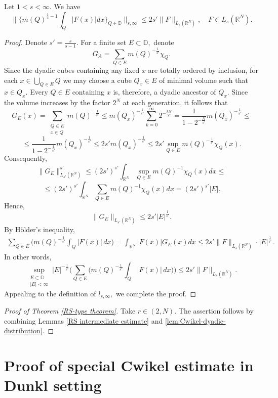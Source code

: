 \documentclass{amsart}
\begin{document}
\begin{lemma}\label{lem:Cwikel-dyadic-distribution} Let $1<s<\infty.$ We have
$$\Big\|\Big\{m(Q)^{\frac1s-1}\int_Q |F(x)|dx\Big\}_{Q\in\mathbb{D} }\Big\|_{s,\infty}\leq 2s'\|F\|_{L_s(\mathbb{R}^N)},\quad F\in L_s(\mathbb{R}^N).$$
\end{lemma}
\begin{proof} Denote $s'=\frac{s}{s-1}.$ For a finite set $E\subset\mathbb{D},$ denote
$$G_A=\sum_{Q\in E}m(Q)^{-\frac1{s'}}\chi_Q.$$
Since the dyadic cubes containing any fixed $x$ are totally ordered by inclusion, for each
$x\in\bigcup_{Q\in E}Q$ we may choose a cube $Q_x\in E$ of minimal volume such that $x\in Q_x.$ Every $Q\in E$ containing $x$ is, therefore, a dyadic ancestor of $Q_x.$ Since the volume increases by the factor $2^N$ at each generation, it follows that
$$G_E(x)=\sum_{\substack{Q\in E\\ x\in Q}}m(Q)^{-\frac1{s'}}
\leq
m(Q_x)^{-\frac1{s'}}\sum_{k=0}^{\infty}2^{-\frac{kN}{s'}}=\frac1{1-2^{-\frac{N}{s'}}}m(Q_x)^{-\frac1{s'}}\leq$$
$$\leq \frac1{1-2^{-\frac1{s'}}}m(Q_x)^{-\frac1{s'}}\leq 2s'm(Q_x)^{-\frac1{s'}}\leq 2s'
\sup_{Q\in E}m(Q)^{-\frac1{s'}}\chi_Q(x).$$
Consequently,
$$\|G_E\|_{L_{s'}(\mathbb{R}^N)}^{s'}
\leq (2s')^{s'}
\int_{\mathbb{R}^N}
\sup_{Q\in E}m(Q)^{-1}\chi_Q(x)dx\leq$$
$$\leq(2s')^{s'}\int_{\mathbb{R}^N}\sum_{Q\in E}m(Q)^{-1}\chi_Q(x)dx=(2s')^{s'}|E|.$$
Hence,
$$\|G_E\|_{L_{s'}(\mathbb{R}^N)}
\leq 2s'|E|^{\frac1{s'}}.$$
By H\"older's inequality,
\begin{align*}
\sum_{Q\in E}\Big(m(Q)^{-\frac1{s'}}\int_Q|F(x)|\,dx\Big)
=\int_{\mathbb{R}^N}|F(x)|G_E(x)dx\leq 2s'\|F\|_{L_s(\mathbb{R}^N)}\cdot|E|^{\frac1{s'}}.
\end{align*}
In other words,
$$\sup_{\substack{E\subset\mathbb{D}\\ |E|<\infty}}|E|^{-\frac1{s'}}\Big(\sum_{Q\in E}\Big(m(Q)^{-\frac1{s'}}\int_Q|F(x)|\,dx\Big)\Big)\leq 2s'\|F\|_{L_s(\mathbb{R}^N)}.$$
Appealing to the definition of $l_{s,\infty},$ we complete the proof.
\end{proof}

\begin{proof}[Proof of Theorem \ref{RS-type theorem}] Take $r\in(2,N).$ The assertion follows by combining Lemmas \ref{RS intermediate estimate} and \ref{lem:Cwikel-dyadic-distribution}.
\end{proof}


\section{Proof of special Cwikel estimate in Dunkl setting}
\end{document}
